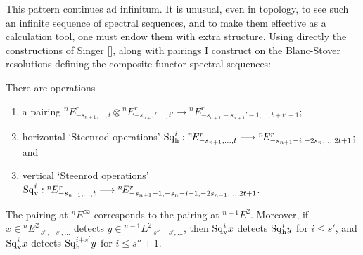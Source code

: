 \documentclass[11pt]{article}
\newcommand{\Sq}{\mathrm{Sq}}
\begin{document}



This pattern continues ad infinitum. It is unusual, even in topology, to see such an infinite sequence of spectral sequences, and to make them effective as a calculation tool, one must endow them with extra structure. Using directly the constructions of Singer [], along with pairings I construct on the Blanc-Stover resolutions defining the composite functor spectral sequences:
\begin{thm*}
There are operations
\begin{enumerate}\squishlist
\setlength{\parindent}{.25in}
\item a pairing ${^{n\!}}E^r_{-s_{n+1},\ldots,t}\otimes {^{n\!}}E^r_{-s_{n+1}',\ldots,t'}\to {^{n\!}}E^r_{-s_{n+1}-s_{n+1}'-1,\ldots,t+t'+1}$;
\item horizontal `Steenrod operations' ${\Sq}^i_\textup{h}:{^{n\!}}E^r_{-s_{n+1},\ldots,t}\to {^{n\!}}E^r_{-s_{n+1}-i,-2s_{n},\ldots,2t+1}$; and
\item vertical `Steenrod operations' ${\Sq}^i_\textup{v}:{^{n\!}}E^r_{-s_{n+1},\ldots,t}\to {^{n\!}}E^r_{-s_{n+1}-1,-s_{n}-i+1,-2s_{n-1},\ldots,2t+1}$.
\end{enumerate}
The pairing at ${^{n\!}}E^\infty$ corresponds to the pairing at ${^{n-1\!}}E^2$. Moreover, if $x\in {^{n\!}}E^2_{-s'',-s',\ldots}$ detects $y\in {^{n-1\!}}E^2_{-s''-s',\ldots}$, then $\Sq_\textup{v}^ix$ detects $\Sq_\textup{h}^iy$ for $i\leq s'$, and $\Sq_\textup{v}^ix$ detects $\Sq_\textup{h}^{i+s'}y$ for $i\leq s''+1$.
\end{thm*}
\end{document}
